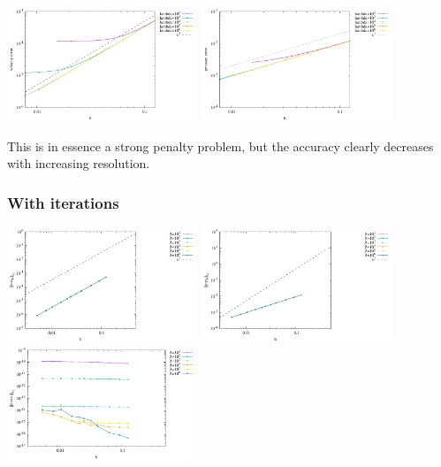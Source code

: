 \begin{center}
\includegraphics[width=5.7cm]{python_codes/fieldstone_161/results/bench1/single/errorsV.pdf}
\includegraphics[width=5.7cm]{python_codes/fieldstone_161/results/bench1/single/errorsP.pdf}
\end{center}

This is in essence a strong penalty problem, but the accuracy clearly decreases 
with increasing resolution. 

\subsubsection*{With iterations}

\begin{center}
\includegraphics[width=5.7cm]{python_codes/fieldstone_161/results/bench1/iterations/errorsV.pdf}
\includegraphics[width=5.7cm]{python_codes/fieldstone_161/results/bench1/iterations/errorsP.pdf}
\includegraphics[width=5.7cm]{python_codes/fieldstone_161/results/bench1/iterations/errorsDivv.pdf}
\end{center}

